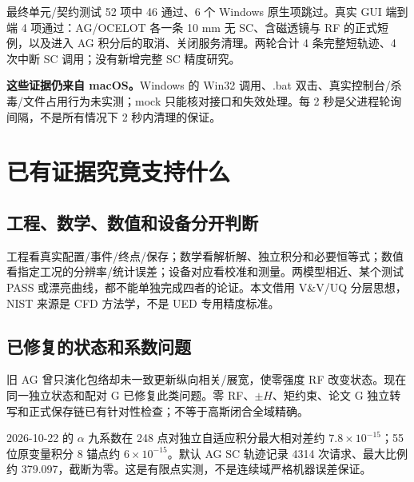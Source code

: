 最终单元/契约测试 52 项中 46 通过、6 个 Windows 原生项跳过。真实 GUI 端到端 4 项通过：AG/OCELOT 各一条 10 mm 无 SC、含磁透镜与 RF 的正式短例，以及进入 AG 积分后的取消、关闭服务清理。两轮合计 4 条完整短轨迹、4 次中断 SC 调用；没有新增完整 SC 精度研究。

\textbf{这些证据仍来自 macOS。}Windows 的 Win32 调用、.bat 双击、真实控制台/杀毒/文件占用行为未实测；mock 只能核对接口和失效处理。每 2 秒是父进程轮询间隔，不是所有情况下 2 秒内清理的保证。

\section{已有证据究竟支持什么}\label{sec:evidence}
\subsection{工程、数学、数值和设备分开判断}
工程看真实配置/事件/终点/保存；数学看解析解、独立积分和必要恒等式；数值看指定工况的分辨率/统计误差；设备对应看校准和测量。两模型相近、某个测试 PASS 或漂亮曲线，都不能单独完成四者的论证。本文借用 V\&V/UQ 分层思想，NIST 来源是 CFD 方法学，不是 UED 专用精度标准\cite{nist}。

\subsection{已修复的状态和系数问题}
旧 AG 曾只演化包络却未一致更新纵向相关/展宽，使零强度 RF 改变状态。现在同一独立状态和配对 G 已修复此类问题。零 RF、$\pm H$、矩约束、论文 G 独立转写和正式保存链已有针对性检查；不等于高斯闭合全域精确。

2026-10-22 的 $\alpha$ 九系数在 248 点对独立自适应积分最大相对差约 $7.8\times10^{-15}$；55 位原变量积分 8 锚点约 $6\times10^{-15}$。默认 AG SC 轨迹记录 4314 次请求、最大比例约 379.097，截断为零。这是有限点实测，不是连续域严格机器误差保证。

